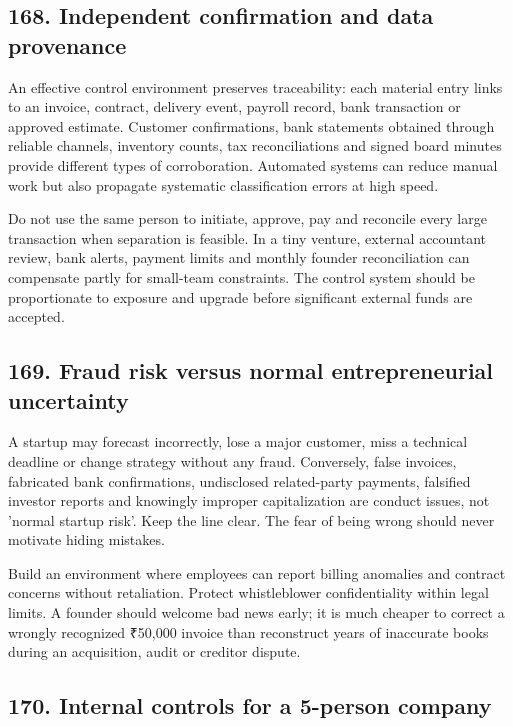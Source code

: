 \subsection{168. Independent confirmation and data provenance}


An effective control environment preserves traceability: each material entry links to an invoice, contract, delivery event, payroll record, bank transaction or approved estimate. Customer confirmations, bank statements obtained through reliable channels, inventory counts, tax reconciliations and signed board minutes provide different types of corroboration. Automated systems can reduce manual work but also propagate systematic classification errors at high speed.

Do not use the same person to initiate, approve, pay and reconcile every large transaction when separation is feasible. In a tiny venture, external accountant review, bank alerts, payment limits and monthly founder reconciliation can compensate partly for small-team constraints. The control system should be proportionate to exposure and upgrade before significant external funds are accepted.

\subsection{169. Fraud risk versus normal entrepreneurial uncertainty}


A startup may forecast incorrectly, lose a major customer, miss a technical deadline or change strategy without any fraud. Conversely, false invoices, fabricated bank confirmations, undisclosed related-party payments, falsified investor reports and knowingly improper capitalization are conduct issues, not 'normal startup risk'. Keep the line clear. The fear of being wrong should never motivate hiding mistakes.

Build an environment where employees can report billing anomalies and contract concerns without retaliation. Protect whistleblower confidentiality within legal limits. A founder should welcome bad news early; it is much cheaper to correct a wrongly recognized ₹50,000 invoice than reconstruct years of inaccurate books during an acquisition, audit or creditor dispute.

\subsection{170. Internal controls for a 5-person company}


